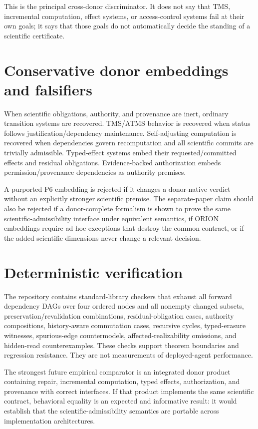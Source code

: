 \documentclass[11pt]{article}
\begin{document}
This is the principal cross-donor discriminator. It does not say that TMS, incremental computation, effect systems, or access-control systems fail at their own goals; it says that those goals do not automatically decide the standing of a scientific certificate.

\section{Conservative donor embeddings and falsifiers}
When scientific obligations, authority, and provenance are inert, ordinary transition systems are recovered. TMS/ATMS behavior is recovered when status follows justification\slash dependency maintenance. Self-adjusting computation is recovered when dependencies govern recomputation and all scientific commits are trivially admissible. Typed-effect systems embed their requested/committed effects and residual obligations. Evidence-backed authorization embeds permission/provenance dependencies as authority premises.

A purported P6 embedding is rejected if it changes a donor-native verdict without an explicitly stronger scientific premise. The separate-paper claim should also be rejected if a donor-complete formalism is shown to prove the same scientific-admissibility interface under equivalent semantics, if ORION embeddings require ad hoc exceptions that destroy the common contract, or if the added scientific dimensions never change a relevant decision.

\section{Deterministic verification}
The repository contains standard-library checkers that exhaust all forward dependency DAGs over four ordered nodes and all nonempty changed subsets, preservation\slash revalidation combinations, residual-obligation cases, authority compositions, history-aware commutation cases, recursive cycles, typed-erasure witnesses, spurious-edge countermodels, affected-realizability omissions, and hidden-read counterexamples. These checks support theorem boundaries and regression resistance. They are not measurements of deployed-agent performance.

The strongest future empirical comparator is an integrated donor product containing repair, incremental computation, typed effects, authorization, and provenance with correct interfaces. If that product implements the same scientific contract, behavioral equality is an expected and informative result: it would establish that the scientific-admissibility semantics are portable across implementation architectures.
\end{document}
